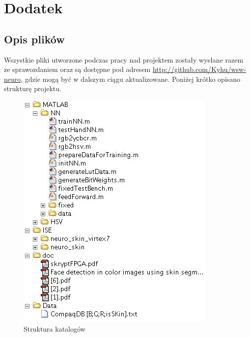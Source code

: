 \chapter{Dodatek}
\label{cha:dodatek}

\section{Opis plików}
Wszystkie pliki utworzone podczas pracy nad projektem zostały wysłane razem ze sprawozdaniem oraz są dostępne pod adresem \url{http://github.com/Kyhu/wsw-neuro}, gdzie mogą być w dalszym ciągu aktualizowane. Poniżej krótko opisano strukturę projektu.

\begin{figure}[tbph!]
\centering
\includegraphics[width=0.63\linewidth]{images/tree.png}
\caption{Struktura katalogów}
\label{fig:tree}
\end{figure}

